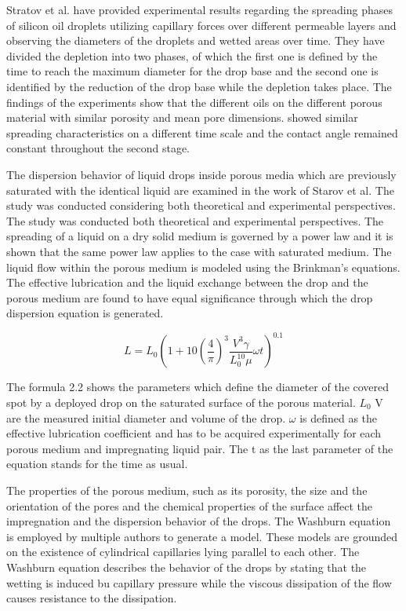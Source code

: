 Stratov et al. have provided experimental results regarding  the spreading phases of silicon oil droplets utilizing capillary forces over different permeable layers and observing the diameters of the droplets and wetted areas over time. They have divided the depletion into two phases, of which the first one is defined by the time to reach the maximum diameter for the drop base and the second one is identified by the reduction of the drop base while the depletion takes place. The findings of the experiments show that the different oils on the different porous material with similar porosity and mean pore dimensions. showed similar spreading characteristics on a different time scale and the contact angle remained constant throughout the second stage.\citep{starov2002thick}

The dispersion behavior of liquid drops inside porous media which are previously saturated with the identical liquid are examined in the work of Starov et al. The study was conducted considering both theoretical and experimental perspectives. The study was conducted both theoretical and experimental perspectives. The spreading of a liquid on a dry solid medium is governed by a power law and it is shown that the same power law applies to the case with saturated medium. The liquid flow within the porous medium is modeled using the Brinkman’s equations. The effective lubrication and the liquid exchange between the drop and the porous medium are found to have equal significance through which the drop dispersion equation is generated. \citep{starov2002saturated}
\newline

\begin{equation}
L=L_0 (1+10(\frac{4}{\pi})^3 \frac{V^3 \gamma}{L_0^{10} \mu}\omega t)^{0.1}
\end{equation}
\newline

The formula 2.2 shows the parameters which define the diameter of the covered spot by a deployed drop on the saturated surface of the porous material. $L_0$ V are the measured initial diameter and volume of the drop. $\omega$ is defined as the effective lubrication coefficient and has to be acquired experimentally for each porous medium and impregnating liquid pair. The t as the last parameter of the equation stands for the time as usual. 

The properties of the porous medium, such as its porosity, the size and the orientation of the pores and the chemical properties of the surface affect the impregnation and the dispersion behavior of the drops. The Washburn equation is employed by multiple authors to generate a model. These models are grounded on the existence of cylindrical capillaries lying parallel to each other. The Washburn equation describes the behavior of the drops by stating that the wetting is induced bu capillary pressure while the viscous dissipation of the flow causes resistance to the dissipation.

